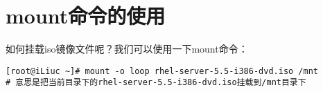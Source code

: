 
\section{mount命令的使用}
\label{sec:mountCmd}

如何挂载iso镜像文件呢？我们可以使用一下mount命令：

\small{
\begin{verbatim}
[root@iLiuc ~]# mount -o loop rhel-server-5.5-i386-dvd.iso /mnt
# 意思是把当前目录下的rhel-server-5.5-i386-dvd.iso挂载到/mnt目录下
\end{verbatim}
}
\normalsize
